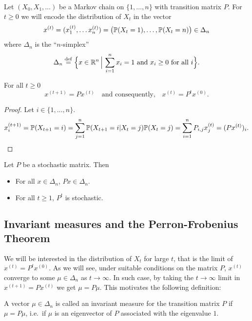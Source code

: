 \documentclass[11pt,nocut]{article}
\begin{document}
Let $(X_0, X_1, \dots)$ be a Markov chain on $\{1, \dots, n\}$ with transition matrix $P$. For $t \geq 0$ we will encode the distribution of $X_t$ in the vector
$$
x^{(t)} = (x^{(t)}_1, \dots x^{(t)}_n) 
= \big(\P(X_t = 1), \dots, \P(X_t = n)\big) \in \Delta_n
$$
where $\Delta_n$ is the ``$n$-simplex''
$$
\Delta_n \defeq \Big\{ x \in \R^n \, \Big| \, \sum_{i=1}^n x_i = 1 \ \text{and} \ x_i \geq 0 \ \text{for all} \ i \Big\}.
$$


\begin{proposition}
	For all $t \geq 0$
	$$
	x^{(t+1)} = P x^{(t)}
	\quad \text{and consequently,} \quad
	x^{(t)} =  P^t x^{(0)}.
	$$
\end{proposition}
\begin{proof} Let $i \in \{1,\dots, n\}$.
	\begin{align*}
		x^{(t+1)}_i
		= \P(X_{t+1}=i)
		= \sum_{j=1}^n \P(X_{t+1}=i|X_t = j) \P(X_t = j)
		= \sum_{i=1}^n P_{i,j} x^{(t)}_j
		= (Px^{(t)})_i.
	\end{align*}
\end{proof}

\begin{corollary}\label{cor:stab}
	Let $P$ be a stochastic matrix. Then
	\begin{itemize}
		\item For all $x \in \Delta_n$, $Px \in \Delta_n$.
		\item For all $t \geq 1$, $P^t$ is stochastic.
	\end{itemize}
\end{corollary}


\subsection{Invariant measures and the Perron-Frobenius Theorem}

We will be interested in the distribution of $X_t$ for large $t$, that is the limit of $x^{(t)} = P^t x^{(0)}$. As we will see, under suitable conditions on the matrix $P$, $x^{(t)}$ converge to some $\mu \in \Delta_n$ as $t \to \infty$. In such case, by taking the $t \to \infty$ limit in $x^{(t+1)} = P x^{(t)}$ we get $\mu = P \mu$. This motivates the following definition:

\begin{definition}
	A vector $\mu \in \Delta_n$ is called an invariant measure for the transition matrix $P$ if $\mu = P \mu$, i.e.\ if $\mu$ is an eigenvector of $P$ associated with the eigenvalue $1$.
\end{definition}
\end{document}
